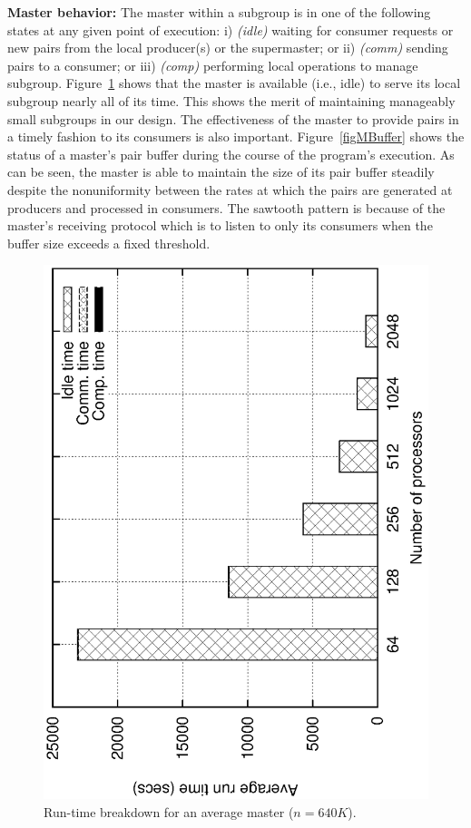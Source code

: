 \documentclass[10pt,journal,letterpaper,compsoc]{IEEEtran}
\begin{document}
{\bf Master behavior:} The master within a subgroup is in one of the following states at any given point of execution: i) \emph{(idle)} waiting for consumer requests or new pairs from the local producer(s) or the supermaster; or ii) \emph{(comm)} sending pairs to a consumer; or iii) \emph{(comp)} performing local operations to manage subgroup. Figure~\ref{figMasterBreakdown} shows that the master is available (i.e., idle) to serve its local subgroup nearly all of its time. This shows the merit of maintaining manageably small subgroups in our design. 
The effectiveness of the master to provide pairs in a timely fashion to its consumers is also important. Figure~\ref{figMBuffer} shows the status of a master's pair buffer during the course of the program's execution. As can be seen, the master is able to maintain the size of its pair buffer steadily despite the nonuniformity between the rates at which the pairs are generated at producers and processed in consumers. The sawtooth pattern is because of the master's receiving protocol which is to listen to only its consumers when the buffer size exceeds a fixed threshold. 


\begin{figure}[thb]
\centerline{
						\includegraphics[angle=-90, scale=0.5]{msBreak.eps}
            }
\caption{
Run-time breakdown for an average master ($n=640K$).
}
\label{figMasterBreakdown}
\end{figure}
\end{document}
